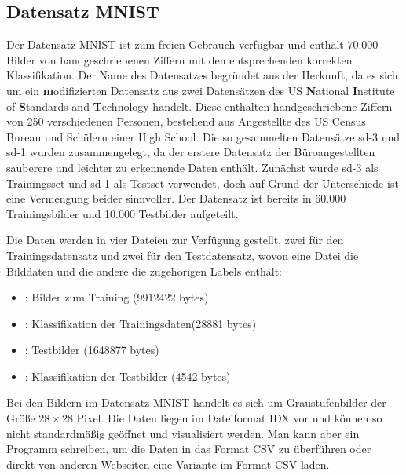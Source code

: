 %
%


\subsection{Datensatz MNIST}

Der Datensatz MNIST ist zum freien Gebrauch verfügbar und enthält 70.000 Bilder von handgeschriebenen Ziffern mit den entsprechenden korrekten Klassifikation. \cite{Deng:2009,Deng:2012} Der Name des Datensatzes begründet aus der Herkunft, da es sich um ein \textbf{m}odifizierten Datensatz aus zwei Datensätzen des US \textbf{N}ational \textbf{I}nstitute of \textbf{S}tandards and \textbf{T}echnology handelt. Diese enthalten handgeschriebene Ziffern von 250 verschiedenen Personen, bestehend aus Angestellte des US Census Bureau und Schülern einer High School. Die so gesammelten Datensätze \ac{sd-3} und \ac{sd-1} wurden zusammengelegt, da der erstere Datensatz der Büroangestellten  sauberere und leichter zu erkennende Daten enthält. Zunächst wurde \ac{sd-3} als Trainingsset und \ac{sd-1} als Testset verwendet, doch auf Grund der Unterschiede ist eine Vermengung beider sinnvoller. Der Datensatz ist bereits in 60.000 Trainingsbilder und 10.000 Testbilder aufgeteilt. \cite{LeCun:2013,Nielsen:2015}

Die Daten werden in vier Dateien zur Verfügung gestellt, zwei für den Trainingsdatensatz und zwei für den Testdatensatz, wovon eine Datei die Bilddaten 
und die andere die zugehörigen Labels enthält:


\begin{itemize}
    \item {}:  Bilder zum Training (9912422 bytes)
    \item {}:  Klassifikation der Trainingsdaten(28881 bytes)
    \item {}:  Testbilder (1648877 bytes)
    \item {}:  Klassifikation der Testbilder (4542 bytes)
\end{itemize}


Bei den Bildern im Datensatz MNIST handelt es sich um Graustufenbilder der Größe $28 \times 28$ Pixel.\cite{LeCun:2013} Die Daten liegen im Dateiformat IDX vor und können so nicht standardmäßig geöffnet und visualisiert werden. Man kann aber ein Programm schreiben, um die Daten in das Format CSV zu überführen oder direkt von anderen Webseiten eine Variante im Format CSV laden. \cite{Redmon:2020}


